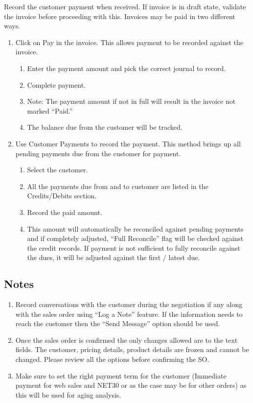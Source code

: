 Record the customer payment when received. If invoice is in draft state, validate the invoice before proceeding with this. Invoices may be paid in two different ways.
\begin{enumerate}
\item Click on Pay in the invoice. This allows payment to be recorded against the invoice.
  \begin{enumerate}
\item Enter the payment amount and pick the correct journal to record.
\item Complete payment.
\item Note: The payment amount if not in full will result in the invoice not marked “Paid.”
\item The balance due from the customer will be tracked.
  \end{enumerate}
\item Use Customer Payments to record the payment. This method brings up all pending payments due from the customer for payment.
  \begin{enumerate}
\item Select the customer.
\item All the payments due from and to customer are listed in the Credits/Debits section.
\item Record the paid amount.
\item This amount will automatically be reconciled against pending payments and if completely adjusted, “Full Reconcile” flag will be checked against the credit records. If payment is not sufficient to fully reconcile against the dues, it will be adjusted against the first / latest due.
  \end{enumerate}
\end{enumerate}

\subsection{Notes}
\begin{enumerate}
\item Record conversations with the customer during the negotiation if any along with the sales order using “Log a Note” feature. If the information needs to reach the customer then the “Send Message” option should be used.
\item Once the sales order is confirmed the only changes allowed are to the text fields. The customer, pricing details, product details are frozen and cannot be changed. Please review all the options before confirming the SO.
\item Make sure to set the right payment term for the customer (Immediate payment for web sales and NET30 or as the case may be for other orders) as this will be used for aging analysis.
\end{enumerate}

